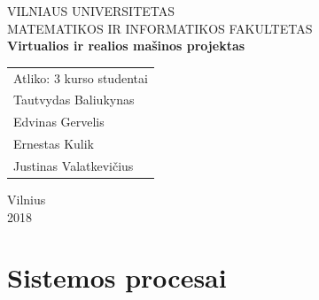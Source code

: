 \documentclass{scrartcl}
\begin{document}
    \newcommand{\instr}[3]{\subparagraph{\makebox[6em][l]{\texttt{#1}}} (\texttt{#2})\par#3\par}
    \begin{titlepage}
        \begin{center}
            VILNIAUS UNIVERSITETAS \\
            MATEMATIKOS IR INFORMATIKOS FAKULTETAS \\
            \vspace{4cm}
            \Large\textbf{Virtualios ir realios mašinos projektas}
        \end{center}
        \vspace{4cm}
        \begin{flushright}
            \begin{tabular}[t]{l}
                Atliko: 3 kurso studentai \\
                Tautvydas Baliukynas \\
                Edvinas Gervelis \\
                Ernestas Kulik \\
                Justinas Valatkevičius
            \end{tabular}
        \end{flushright}
        \vspace*{\fill}
        \begin{center}
            \large{Vilnius \\ 2018}
        \end{center}
    \end{titlepage}

    \section{Sistemos procesai}
\end{document}
